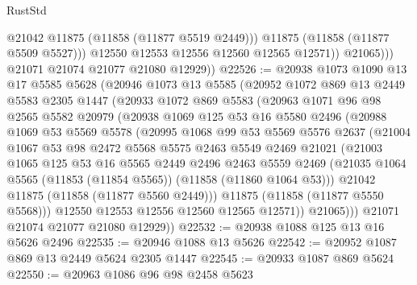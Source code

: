 \begin{lexlean}{RustStd}
\begin{coremodule}
                      @21042
                      @11875
                      (@11858 (@11877 @5519 @2449)))
                    @11875
                    (@11858 (@11877 @5509 @5527)))
                  @12550
                  @12553
                  @12556
                  @12560
                  @12565
                  @12571))
              @21065)))
        @21071
        @21074
        @21077
        @21080
        @12929))
@22526 := @20938
    @1073
    @1090
    @13
    @17
    @5585
    @5628
    (@20946
      @1073
      @13
      @5585
      (@20952
        @1072
        @869
        @13
        @2449
        @5583
        @2305
        @1447
        (@20933
          @1072
          @869
          @5583
          (@20963
            @1071
            @96
            @98
            @2565
            @5582
            @20979
            (@20938
              @1069
              @125
              @53
              @16
              @5580
              @2496
              (@20988
                @1069
                @53
                @5569
                @5578
                (@20995
                  @1068
                  @99
                  @53
                  @5569
                  @5576
                  @2637
                  (@21004
                    @1067
                    @53
                    @98
                    @2472
                    @5568
                    @5575
                    @2463
                    @5549
                    @2469
                    @21021
                    (@21003
                      @1065
                      @125
                      @53
                      @16
                      @5565
                      @2449
                      @2496
                      @2463
                      @5559
                      @2469
                      (@21035 @1064 @5565 (@11853 (@11854 @5565)) (@11858 (@11860 @1064 @53)))
                      @21042
                      @11875
                      (@11858 (@11877 @5560 @2449)))
                    @11875
                    (@11858 (@11877 @5550 @5568)))
                  @12550
                  @12553
                  @12556
                  @12560
                  @12565
                  @12571))
              @21065)))
        @21071
        @21074
        @21077
        @21080
        @12929))
@22532 := @20938 @1088 @125 @13 @16 @5626 @2496
@22535 := @20946 @1088 @13 @5626
@22542 := @20952 @1087 @869 @13 @2449 @5624 @2305 @1447
@22545 := @20933 @1087 @869 @5624
@22550 := @20963 @1086 @96 @98 @2458 @5623

\end{coremodule}
\end{lexlean}
